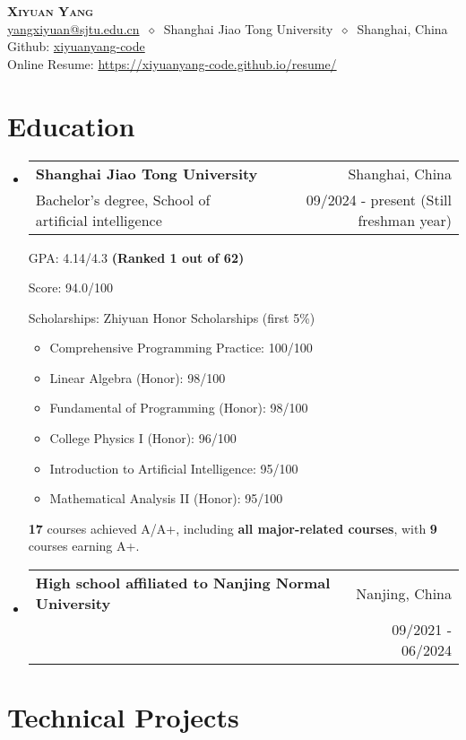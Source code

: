 \documentclass[letterpaper,11pt]{article}
\makeatletter
\newcommand{\cvheading}[4]{
  \vspace{-2pt}\item
    \begin{tabular*}{\textwidth}[t]{l@{\extracolsep{\fill}}r}
      \textbf{#1} & #2 \\
      \small#3 & \small #4 \\
    \end{tabular*}\vspace{-7pt}
}
\newcommand{\cvheadingstart}{\begin{itemize}[leftmargin=0in, label={}]}
\newcommand{\cvheadingend}{\end{itemize}}
\makeatother
\begin{document}
\begin{center}
  \textbf{\LARGE\scshape Xiyuan Yang} \\
  \vspace{1pt}\small
  \href{mailto:}{yangxiyuan@sjtu.edu.cn}
  $\ \diamond\ $
  Shanghai Jiao Tong University
  $\ \diamond\ $
  Shanghai, China
  \\
  Github: \href{https://github.com/xiyuanyang-code}{xiyuanyang-code}
  \\
  Online Resume: \href{https://xiyuanyang-code.github.io/resume}{https://xiyuanyang-code.github.io/resume/}
\end{center}



\section{Education}
\cvheadingstart
  \cvheading
    {Shanghai Jiao Tong University}{Shanghai, China}
    {Bachelor's degree, School of artificial intelligence}{09/2024 - present (Still freshman year)}

    GPA: 4.14/4.3 \textbf{(Ranked 1 out of 62)}

    Score: 94.0/100

    Scholarships: Zhiyuan Honor Scholarships (first 5\%)
    
    \begin{itemize}[nosep]
    \item Comprehensive Programming Practice: 100/100
    \item Linear Algebra (Honor): 98/100
    \item Fundamental of Programming (Honor): 98/100
    \item College Physics I (Honor): 96/100
    \item Introduction to Artificial Intelligence: 95/100
    \item Mathematical Analysis II (Honor): 95/100
    \end{itemize}
    \textbf{17} courses achieved A/A+, including \textbf{all major-related courses}, with \textbf{9} courses earning A+.
  \cvheading
    {High school affiliated to Nanjing Normal University}{Nanjing, China}
    {}{09/2021 - 06/2024}
\cvheadingend

\vspace{-5pt}

\section{Technical Projects}
\end{document}
